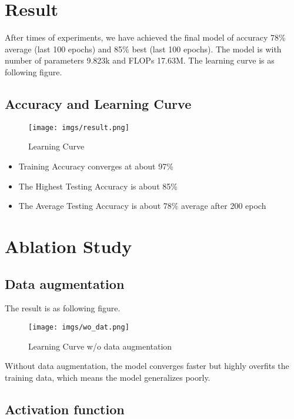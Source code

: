 \documentclass[12pt]{article}
\begin{document}
\section{Result}

After times of experiments, we have achieved the final model of accuracy 78\% average (last 100 epochs) and 85\% best (last 100 epochs). The model is with number of parameters 9.823k and FLOPs 17.63M.
The learning curve is as following figure.

\subsection{Accuracy and Learning Curve}

\begin{figure}[!htbp]
    \centering
    \texttt{[image: imgs/result.png]}
    \caption{Learning Curve}
    \label{fig:wodat}
\end{figure}

\begin{itemize}
    \item Training Accuracy converges at about 97\%
    \item The Highest Testing Accuracy is about 85\%
    \item The Average Testing Accuracy is about 78\% average after 200 epoch
\end{itemize}

\section{Ablation Study}

\subsection{Data augmentation}

The result is as following figure.

\begin{figure}[!htbp]
    \centering
    \texttt{[image: imgs/wo\_dat.png]}
    \caption{Learning Curve  w/o data augmentation}
    \label{fig:wodat}
\end{figure}

Without data augmentation, the model converges faster but highly overfits the training data, which means the model generalizes poorly.

\subsection{Activation function}
\end{document}
